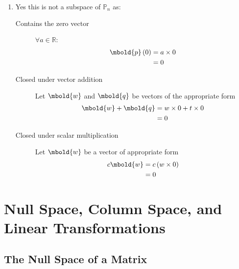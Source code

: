 \documentclass[12pt letter]{report}
\begin{document}
{\begin{enumerate}
\begin{description}
          \end{description}
    \item Yes this is not a subspace of $\mathbb{P}_n$ as:
          \begin{description}
            \item[Contains the zero vector] $\forall a \in \mathbb{R}$:
                  \begin{align*}
                    \mbold{p} \left( 0 \right) & = a\times 0 \\
                                               & = 0         \\
                  \end{align*}
            \item[Closed under vector addition] Let $\mbold{w}$ and $\mbold{q}$ be vectors of the appropriate form
                  \begin{align*}
                    \mbold{w} + \mbold{q} & = w\times 0 + t \times 0 \\
                                          & = 0                      \\
                  \end{align*}
            \item[Closed under scalar multiplication] Let $\mbold{w}$ be a vector of appropriate form
                  \begin{align*}
                    c \mbold{w} & = c \left( w\times 0 \right) \\
                                & = 0                          \\
                  \end{align*}
          \end{description}

  \end{enumerate}
}

\chapter{Null Space, Column Space, and Linear Transformations}

\section{The Null Space of a Matrix}

\end{document}
